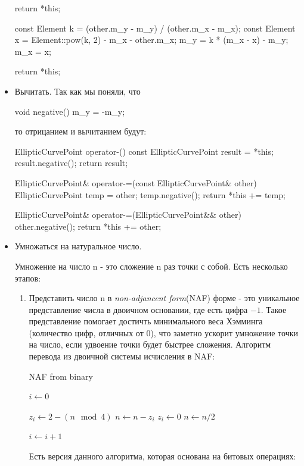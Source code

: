 \begin{itemize}
\begin{cppcode}
{{        return *this;
    }

    const Element k = (other.m_y - m_y) / (other.m_x - m_x);
    const Element x = Element::pow(k, 2) - m_x - other.m_x;
    m_y = k * (m_x - x) - m_y;
    m_x = x;

    return *this;
}
    \end{cppcode}
    \item Вычитать. Так как мы поняли, что
    \begin{cppcode}
void negative() {
    m_y = -m_y;
}
    \end{cppcode}
    то отрицанием и вычитанием будут:
    \begin{cppcode}
EllipticCurvePoint operator-() const {
    EllipticCurvePoint result = *this;
    result.negative();
    return result;
}

EllipticCurvePoint& operator-=(const EllipticCurvePoint& other) {
    EllipticCurvePoint temp = other;
    temp.negative();
    return *this += temp;
}

EllipticCurvePoint& operator-=(EllipticCurvePoint&& other) {
    other.negative();
    return *this += other;
}
    \end{cppcode}
    \item Умножаться на натуральное число.

    Умножение на число n - это сложение n раз точки с собой. Есть несколько этапов:
    \begin{enumerate}
      \item Представить число n в \textit{non-adjancent form}(NAF) форме - это уникальное представление числа в двоичном основании, где есть цифра $-1$. Такое представление помогает достичть минимального веса Хэмминга (количество цифр, отличных от 0), что заметно ускорит умножение точки на число, если удвоение точки будет быстрее сложения. Алгоритм перевода из двоичной системы исчисления в NAF: 

       \begin{algorithm}[H]
        \caption{NAF from binary}
        $i\gets 0$

         {
           {
            $z_i\gets 2 - (n\mod 4)$
            $n\gets n - z_i$
          } {
            $z_i\gets 0$
          }
          $n\gets n/2$

          $i\gets i+1$
        }
      \end{algorithm}
       Есть версия данного алгоритма, которая основана на битовых операциях:


\end{enumerate}
\end{itemize}
